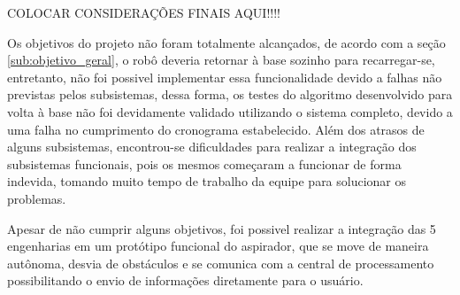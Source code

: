 
COLOCAR CONSIDERAÇÕES FINAIS AQUI!!!!

Os objetivos do projeto não foram totalmente alcançados, de acordo com a seção \ref{sub:objetivo_geral}, o robô deveria retornar à base sozinho para recarregar-se, entretanto, não foi possivel implementar essa funcionalidade devido a falhas não previstas pelos subsistemas, dessa forma, os testes do algoritmo desenvolvido para volta à base não foi devidamente validado utilizando o sistema completo, devido a uma falha no cumprimento do cronograma estabelecido. Além dos atrasos de alguns subsistemas, encontrou-se dificuldades para realizar a integração dos subsistemas funcionais, pois os mesmos começaram a funcionar de forma indevida, tomando muito tempo de trabalho da equipe para solucionar os problemas.

Apesar de não cumprir alguns objetivos, foi possivel realizar a integração das 5 engenharias em um protótipo funcional do aspirador, que se move de maneira autônoma, desvia de obstáculos e se comunica com a central de processamento possibilitando o envio de informações diretamente para o usuário.

